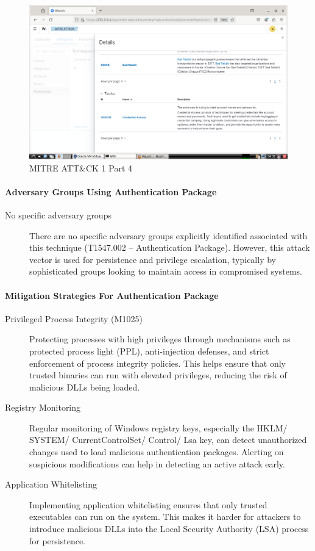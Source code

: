 \documentclass[12pt,a4paper]{report}
\begin{document}
\begin{figure}[H]
\centering
\includegraphics[width=\textwidth]{ATTK 1 PIC 4.png}
\caption{MITRE ATT\&CK 1 Part 4}
\end{figure}

\newpage

\paragraph{Adversary Groups Using Authentication Package}
\begin{description}
	\item[No specific adversary groups] There are no specific adversary groups explicitly identified associated with this technique (T1547.002 – Authentication Package). However, this attack vector is used for persistence and privilege escalation, typically by sophisticated groups looking to maintain access in compromised systems.
\end{description}

\paragraph{Mitigation Strategies For Authentication Package}
\begin{description}
	\item[Privileged Process Integrity (M1025)] Protecting processes with high privileges through mechanisms such as protected process light (PPL), anti-injection defenses, and strict enforcement of process integrity policies. This helps ensure that only trusted binaries can run with elevated privileges, reducing the risk of malicious DLLs being loaded.
	
	\item[Registry Monitoring] Regular monitoring of Windows registry keys, especially the HKLM/ SYSTEM/ CurrentControlSet/ Control/ Lsa key, can detect unauthorized changes used to load malicious authentication packages. Alerting on suspicious modifications can help in detecting an active attack early.
	
	\item[Application Whitelisting] Implementing application whitelisting ensures that only trusted executables can run on the system. This makes it harder for attackers to introduce malicious DLLs into the Local Security Authority (LSA) process for persistence.
\end{description}
\end{document}
